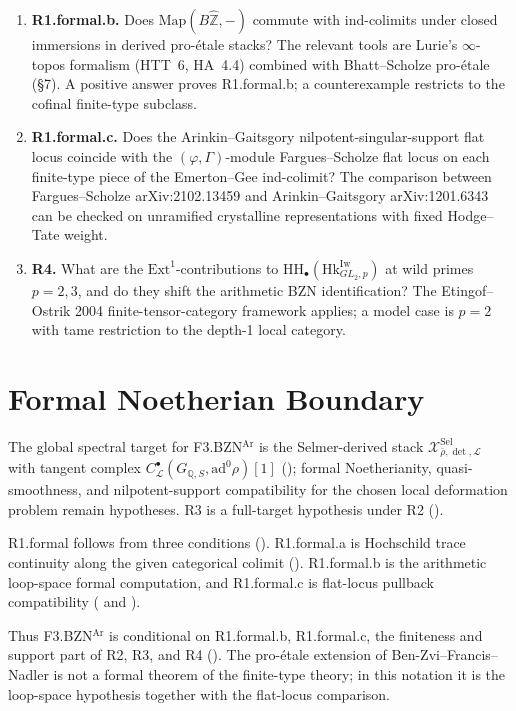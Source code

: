 \begin{enumerate}
\item \textbf{R1.formal.b.} Does \(\mathrm{Map}(B\widehat{\mathbb{Z}},-)\)
commute with ind-colimits under closed immersions in derived pro-\'etale
stacks? The relevant tools are Lurie's \(\infty\)-topos formalism
(HTT~6, HA~4.4) combined with Bhatt--Scholze pro-\'etale (\S7).
A positive answer proves R1.formal.b; a counterexample restricts
 to the cofinal
finite-type subclass.
\item \textbf{R1.formal.c.} Does the Arinkin--Gaitsgory nilpotent-singular-support
flat locus coincide with the \((\varphi,\Gamma)\)-module Fargues--Scholze
flat locus on each finite-type piece of the Emerton--Gee ind-colimit?
The comparison between Fargues--Scholze arXiv:2102.13459 and
Arinkin--Gaitsgory arXiv:1201.6343 can be checked on unramified
crystalline representations with fixed Hodge--Tate weight.
\item \textbf{R4.} What are the \(\mathrm{Ext}^{1}\)-contributions to
\(\mathrm{HH}_{\bullet}(\mathrm{Hk}^{\mathrm{Iw}}_{GL_{2},p})\) at
wild primes \(p=2,3\), and do they shift the arithmetic BZN
identification? The Etingof--Ostrik 2004 finite-tensor-category
framework applies; a model case is \(p=2\) with tame restriction
to the depth-1 local category.
\end{enumerate}

\section{Formal Noetherian Boundary}
\label{v4-arith:bzn-sub:summary}

The global spectral target for F3.BZN\(^{\mathrm{Ar}}\) is the
Selmer-derived stack
\(\mathcal{X}^{\mathrm{Sel}}_{\bar\rho,\det,\mathcal{L}}\) with tangent
complex \(C^{\bullet}_{\mathcal{L}}(G_{\mathbb{Q},S},\mathrm{ad}^{0}\rho)[1]\)
(); formal Noetherianity,
quasi-smoothness, and nilpotent-support compatibility for the
chosen local deformation problem remain hypotheses.
R3 is a full-target hypothesis under R2
().

R1.formal follows from three conditions
().
R1.formal.a is Hochschild trace continuity along the given
categorical colimit ().
R1.formal.b is the arithmetic loop-space formal computation, and
R1.formal.c is flat-locus pullback compatibility
( and
).

Thus F3.BZN\(^{\mathrm{Ar}}\) is conditional on R1.formal.b,
R1.formal.c, the finiteness and support part of R2, R3, and R4
(). The pro-\'etale
extension of Ben-Zvi--Francis--Nadler is not a formal theorem of the
finite-type theory; in this notation it is the loop-space hypothesis
together with the flat-locus comparison.
